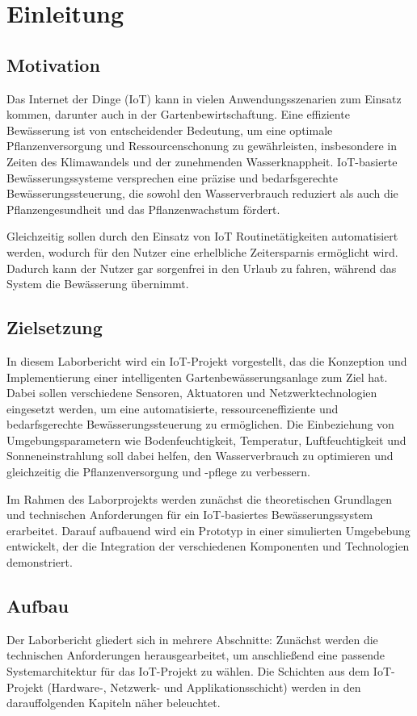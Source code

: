 
\section{Einleitung}

\subsection{Motivation}
Das Internet der Dinge (IoT) kann in vielen Anwendungsszenarien zum Einsatz kommen, darunter auch in der Gartenbewirtschaftung. Eine effiziente Bewässerung ist von entscheidender Bedeutung, um eine optimale Pflanzenversorgung und Ressourcenschonung zu gewährleisten, insbesondere in Zeiten des Klimawandels und der zunehmenden Wasserknappheit. IoT-basierte Bewässerungssysteme versprechen eine präzise und bedarfsgerechte Bewässerungssteuerung, die sowohl den Wasserverbrauch reduziert als auch die Pflanzengesundheit und das Pflanzenwachstum fördert.

Gleichzeitig sollen durch den Einsatz von IoT Routinetätigkeiten automatisiert werden, wodurch für den Nutzer eine erhelbliche Zeitersparnis ermöglicht wird.
Dadurch kann der Nutzer gar sorgenfrei in den Urlaub zu fahren, während das System die Bewässerung übernimmt.

\subsection{Zielsetzung}

In diesem Laborbericht wird ein IoT-Projekt vorgestellt, das die Konzeption und Implementierung einer intelligenten Gartenbewässerungsanlage zum Ziel hat. Dabei sollen verschiedene Sensoren, Aktuatoren und Netzwerktechnologien eingesetzt werden, um eine automatisierte, ressourceneffiziente und bedarfsgerechte Bewässerungssteuerung zu ermöglichen. Die Einbeziehung von Umgebungsparametern wie Bodenfeuchtigkeit, Temperatur, Luftfeuchtigkeit und Sonneneinstrahlung soll dabei helfen, den Wasserverbrauch zu optimieren und gleichzeitig die Pflanzenversorgung und -pflege zu verbessern.

Im Rahmen des Laborprojekts werden zunächst die theoretischen Grundlagen und technischen Anforderungen für ein IoT-basiertes Bewässerungssystem erarbeitet. Darauf aufbauend wird ein Prototyp in einer simulierten Umgebebung entwickelt, der die Integration der verschiedenen Komponenten und Technologien demonstriert. 

\subsection{Aufbau}

Der Laborbericht gliedert sich in mehrere Abschnitte: Zunächst werden die technischen Anforderungen herausgearbeitet, um anschließend eine passende Systemarchitektur für das IoT-Projekt zu wählen. 
Die Schichten aus dem IoT-Projekt (Hardware-, Netzwerk- und Applikationsschicht) werden in den darauffolgenden Kapiteln näher beleuchtet.